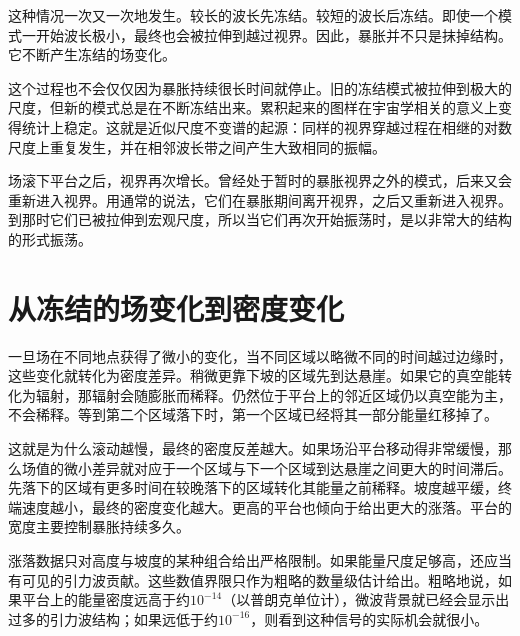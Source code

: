 这种情况一次又一次地发生。较长的波长先冻结。较短的波长后冻结。即使一个模式一开始波长极小，最终也会被拉伸到越过视界。因此，暴胀并不只是抹掉结构。它不断产生冻结的场变化。

这个过程也不会仅仅因为暴胀持续很长时间就停止。旧的冻结模式被拉伸到极大的尺度，但新的模式总是在不断冻结出来。累积起来的图样在宇宙学相关的意义上变得统计上稳定。这就是近似尺度不变谱的起源：同样的视界穿越过程在相继的对数尺度上重复发生，并在相邻波长带之间产生大致相同的振幅。

场滚下平台之后，视界再次增长。曾经处于暂时的暴胀视界之外的模式，后来又会重新进入视界。用通常的说法，它们在暴胀期间离开视界，之后又重新进入视界。到那时它们已被拉伸到宏观尺度，所以当它们再次开始振荡时，是以非常大的结构的形式振荡。

\begin{classroomqa}
\end{classroomqa}

\begin{classroomqa}
\end{classroomqa}

\section{从冻结的场变化到密度变化}

一旦场在不同地点获得了微小的变化，当不同区域以略微不同的时间越过边缘时，这些变化就转化为密度差异。稍微更靠下坡的区域先到达悬崖。如果它的真空能转化为辐射，那辐射会随膨胀而稀释。仍然位于平台上的邻近区域仍以真空能为主，不会稀释。等到第二个区域落下时，第一个区域已经将其一部分能量红移掉了。

这就是为什么滚动越慢，最终的密度反差越大。如果场沿平台移动得非常缓慢，那么场值的微小差异就对应于一个区域与下一个区域到达悬崖之间更大的时间滞后。先落下的区域有更多时间在较晚落下的区域转化其能量之前稀释。坡度越平缓，终端速度越小，最终的密度变化越大。更高的平台也倾向于给出更大的涨落。平台的宽度主要控制暴胀持续多久。

涨落数据只对高度与坡度的某种组合给出严格限制。如果能量尺度足够高，还应当有可见的引力波贡献。这些数值界限只作为粗略的数量级估计给出。粗略地说，如果平台上的能量密度远高于约\(10^{-14}\)（以普朗克单位计），微波背景就已经会显示出过多的引力波结构；如果远低于约\(10^{-16}\)，则看到这种信号的实际机会就很小。

